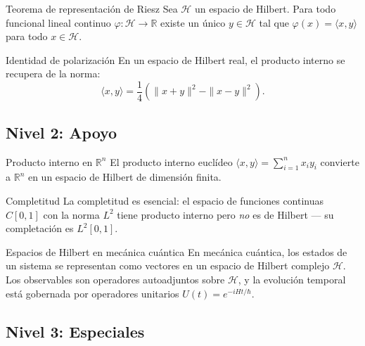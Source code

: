 \begin{teorema}{Teorema de representación de Riesz}
Sea $\mathcal{H}$ un espacio de Hilbert. Para todo funcional lineal continuo
$\varphi: \mathcal{H} \to \mathbb{R}$ existe un único $y \in \mathcal{H}$
tal que $\varphi(x) = \langle x, y \rangle$ para todo $x \in \mathcal{H}$.
\end{teorema}

\begin{proposicion}{Identidad de polarización}
En un espacio de Hilbert real, el producto interno se recupera de la norma:
\[
\langle x, y \rangle
= \frac{1}{4}\left(\|x+y\|^2 - \|x-y\|^2\right).
\]
\end{proposicion}

\subsection{Nivel 2: Apoyo}

\begin{ejemplo}{Producto interno en $\mathbb{R}^n$}
El producto interno euclídeo $\langle x, y \rangle = \sum_{i=1}^n x_i y_i$
convierte a $\mathbb{R}^n$ en un espacio de Hilbert de dimensión finita.
\end{ejemplo}

\begin{observacion}{Completitud}
La completitud es esencial: el espacio de funciones continuas $C[0,1]$ con
la norma $L^2$ tiene producto interno pero \textit{no} es de Hilbert --- su
completación es $L^2[0,1]$.
\end{observacion}

\begin{fisicaconexion}{Espacios de Hilbert en mecánica cuántica}
En mecánica cuántica, los estados de un sistema se representan como vectores
en un espacio de Hilbert complejo $\mathcal{H}$. Los observables son operadores
autoadjuntos sobre $\mathcal{H}$, y la evolución temporal está gobernada por
operadores unitarios $U(t) = e^{-iHt/\hbar}$.
\end{fisicaconexion}

\subsection{Nivel 3: Especiales}

